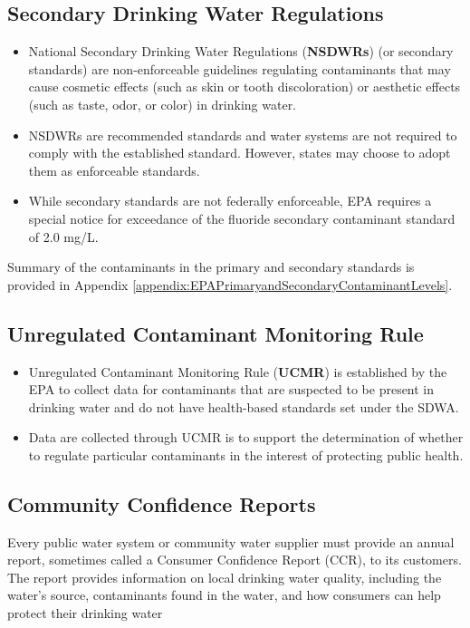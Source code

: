 \subsection{Secondary Drinking Water Regulations}
\begin{itemize}
\item National Secondary Drinking Water Regulations (\textbf{NSDWRs}) (or secondary standards) are non-enforceable guidelines regulating contaminants that may cause cosmetic effects (such as skin or tooth discoloration) or aesthetic effects (such as taste, odor, or color) in drinking water.
\item NSDWRs are recommended standards and water systems are not required to comply with the established standard. However, states may choose to adopt them as enforceable standards.
\item While secondary standards are not federally enforceable, EPA requires a special notice for exceedance of the fluoride  secondary contaminant standard of 2.0 mg/L.
\end{itemize}

\vspace{0.3cm}
Summary of the contaminants in the primary and secondary standards is provided in Appendix \ref{appendix:EPAPrimaryandSecondaryContaminantLevels}.

\subsection{Unregulated Contaminant Monitoring Rule}
\begin{itemize}
\item Unregulated Contaminant Monitoring Rule (\textbf{UCMR}) is established by the EPA to collect data for contaminants that are suspected to be present in drinking water and do not have health-based standards set under the SDWA.
\item Data are collected through UCMR is to support the determination of whether to regulate particular contaminants in the interest of protecting public health. \\
\end{itemize}


\subsection{Community Confidence Reports}
Every public water system or community water supplier must provide an annual report, sometimes called a Consumer Confidence Report (CCR), to its customers. The report provides information on local drinking water quality, including the water’s source, contaminants found in the water, and how consumers can help protect their drinking water


